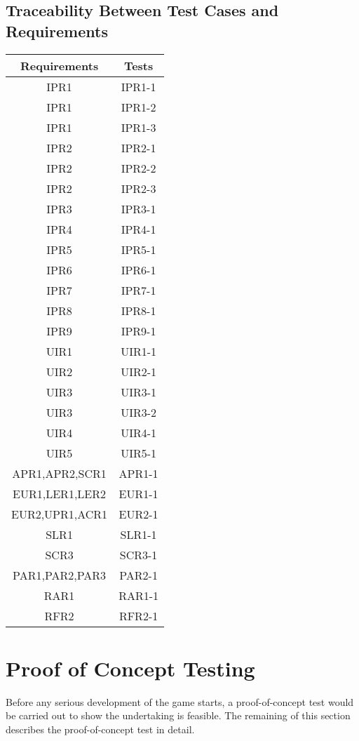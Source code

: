 \documentclass[12pt, titlepage]{article}
\begin{document}
\subsection{Traceability Between Test Cases and Requirements}
\begin{center}
    \begin{tabular}{||c | c ||}
    \hline
    Requirements & Tests\\
    \hline
    IPR1&IPR1-1\\
    \hline
    IPR1&IPR1-2\\
    \hline
    IPR1&IPR1-3\\
    \hline
    IPR2&IPR2-1\\
    \hline
    IPR2&IPR2-2\\
    \hline
    IPR2&IPR2-3\\
    \hline
    IPR3&IPR3-1\\
    \hline
    IPR4&IPR4-1\\
    \hline
    IPR5&IPR5-1\\
    \hline
    IPR6&IPR6-1\\
    \hline
    IPR7&IPR7-1\\
    \hline
    IPR8&IPR8-1\\
    \hline
    IPR9&IPR9-1\\
    \hline
    UIR1&UIR1-1\\
    \hline
    UIR2&UIR2-1\\
    \hline
    UIR3&UIR3-1\\
    \hline
    UIR3&UIR3-2\\
    \hline
    UIR4&UIR4-1\\
    \hline
    UIR5&UIR5-1\\
    \hline
    APR1,APR2,SCR1 & APR1-1\\
    \hline
    EUR1,LER1,LER2 & EUR1-1\\
    \hline
    EUR2,UPR1,ACR1 & EUR2-1\\
    \hline
    SLR1 & SLR1-1\\
    \hline
    SCR3 & SCR3-1\\
    \hline
    PAR1,PAR2,PAR3 & PAR2-1\\
    \hline
    RAR1 & RAR1-1\\
    \hline
    RFR2 & RFR2-1\\
    \hline
    \end{tabular}
    
\end{center}

\section{Proof of Concept Testing}
Before any serious development of the game starts, a proof-of-concept test would be carried out to show the undertaking is feasible. The remaining of this section describes the proof-of-concept test in detail.
\end{document}
